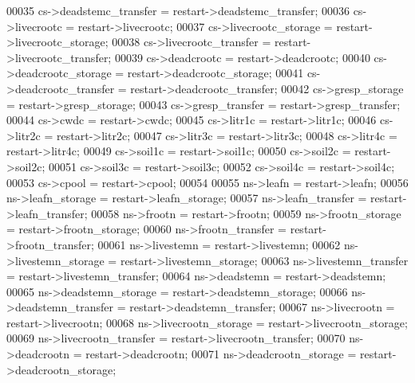 \begin{DoxyCode}
00035     cs->deadstemc\_transfer                = restart->deadstemc\_transfer;
00036     cs->livecrootc                        = restart->livecrootc;
00037     cs->livecrootc\_storage                = restart->livecrootc\_storage;
00038     cs->livecrootc\_transfer               = restart->livecrootc\_transfer;
00039     cs->deadcrootc                        = restart->deadcrootc;
00040     cs->deadcrootc\_storage                = restart->deadcrootc\_storage;
00041     cs->deadcrootc\_transfer               = restart->deadcrootc\_transfer;
00042     cs->gresp\_storage                     = restart->gresp\_storage;
00043     cs->gresp\_transfer                    = restart->gresp\_transfer;
00044     cs->cwdc                              = restart->cwdc;
00045     cs->litr1c                            = restart->litr1c;
00046     cs->litr2c                            = restart->litr2c;
00047     cs->litr3c                            = restart->litr3c;
00048     cs->litr4c                            = restart->litr4c;
00049     cs->soil1c                            = restart->soil1c;
00050     cs->soil2c                            = restart->soil2c;
00051     cs->soil3c                            = restart->soil3c;
00052     cs->soil4c                            = restart->soil4c;
00053     cs->cpool                             = restart->cpool;
00054     
00055     ns->leafn                             = restart->leafn;
00056     ns->leafn\_storage                     = restart->leafn\_storage;
00057     ns->leafn\_transfer                    = restart->leafn\_transfer;
00058     ns->frootn                            = restart->frootn;
00059     ns->frootn\_storage                    = restart->frootn\_storage;
00060     ns->frootn\_transfer                   = restart->frootn\_transfer;
00061     ns->livestemn                         = restart->livestemn;
00062     ns->livestemn\_storage                 = restart->livestemn\_storage;
00063     ns->livestemn\_transfer                = restart->livestemn\_transfer;
00064     ns->deadstemn                         = restart->deadstemn;
00065     ns->deadstemn\_storage                 = restart->deadstemn\_storage;
00066     ns->deadstemn\_transfer                = restart->deadstemn\_transfer;
00067     ns->livecrootn                        = restart->livecrootn;
00068     ns->livecrootn\_storage                = restart->livecrootn\_storage;
00069     ns->livecrootn\_transfer               = restart->livecrootn\_transfer;
00070     ns->deadcrootn                        = restart->deadcrootn;
00071     ns->deadcrootn\_storage                = restart->deadcrootn\_storage;

\end{DoxyCode}
